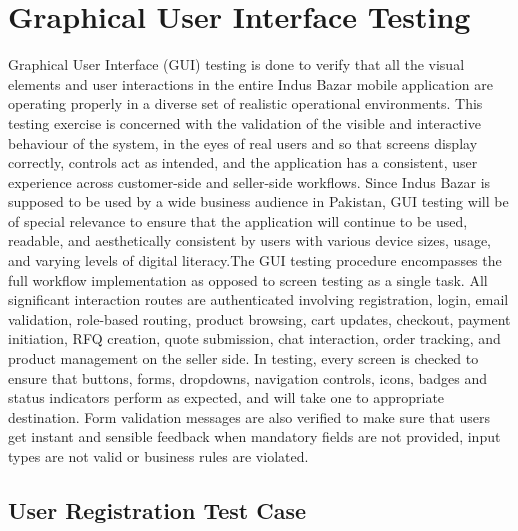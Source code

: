\section{Graphical User Interface Testing}
Graphical User Interface (GUI) testing is done to verify that all the visual elements and user interactions in the entire Indus Bazar mobile application are operating properly in a diverse set of realistic operational environments. This testing exercise is concerned with the validation of the visible and interactive behaviour of the system, in the eyes of real users and so that screens display correctly, controls act as intended, and the application has a consistent, user experience across customer-side and seller-side workflows. Since Indus Bazar is supposed to be used by a wide business audience in Pakistan, GUI testing will be of special relevance to ensure that the application will continue to be used, readable, and aesthetically consistent by users with various device sizes, usage, and varying levels of digital literacy.The GUI testing procedure encompasses the full workflow implementation as opposed to screen testing as a single task. All significant interaction routes are authenticated involving registration, login, email validation, role-based routing, product browsing, cart updates, checkout, payment initiation, RFQ creation, quote submission, chat interaction, order tracking, and product management on the seller side. In testing, every screen is checked to ensure that buttons, forms, dropdowns, navigation controls, icons, badges and status indicators perform as expected, and will take one to appropriate destination. Form validation messages are also verified to make sure that users get instant and sensible feedback when mandatory fields are not provided, input types are not valid or business rules are violated.

\subsection{User Registration Test Case}

